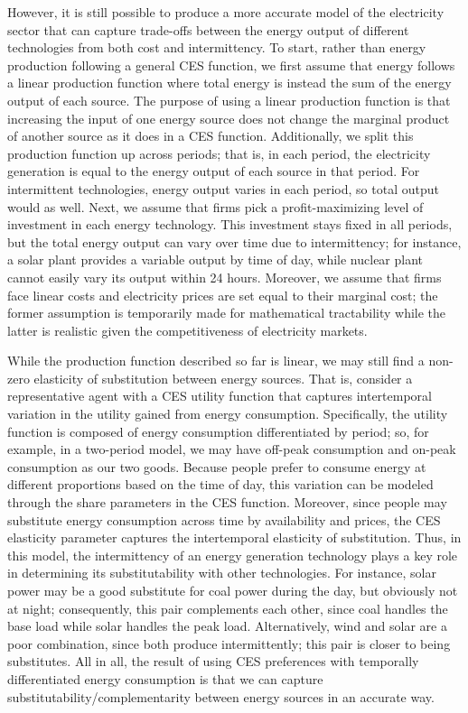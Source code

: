 \documentclass[11pt,a4paper]{extarticle}
\begin{document}
However, it is still possible to produce a more accurate model of the electricity sector that can capture trade-offs between the energy output of different technologies from both cost and intermittency. To start, rather than energy production following a general CES function, we first assume that energy follows a linear production function where total energy is instead the sum of the energy output of each source. The purpose of using a linear production function is that increasing the input of one energy source does not change the marginal product of another source as it does in a CES function. Additionally, we split this production function up across periods; that is, in each period, the electricity generation is equal to the energy output of each source in that period. For intermittent technologies, energy output varies in each period, so total output would as well. Next, we assume that firms pick a profit-maximizing level of investment in each energy technology. This investment stays fixed in all periods, but the total energy output can vary over time due to intermittency; for instance, a solar plant provides a variable output by time of day, while nuclear plant cannot easily vary its output within 24 hours. Moreover, we assume that firms face linear costs and electricity prices are set equal to their marginal cost; the former assumption is temporarily made for mathematical tractability while the latter is realistic given the competitiveness of electricity markets. 

While the production function described so far is linear, we may still find a non-zero elasticity of substitution between energy sources. That is, consider a representative agent with a CES utility function that captures intertemporal variation in the utility gained from energy consumption. Specifically, the utility function is composed of energy consumption differentiated by period; so, for example, in a two-period model, we may have off-peak consumption and on-peak consumption as our two goods. Because people prefer to consume energy at different proportions based on the time of day, this variation can be modeled through the share parameters in the CES function. Moreover, since people may substitute energy consumption across time by availability and prices, the CES elasticity parameter captures the intertemporal elasticity of substitution. Thus, in this model, the intermittency of an energy generation technology plays a key role in determining its substitutability with other technologies. For instance, solar power may be a good substitute for coal power during the day, but obviously not at night; consequently, this pair complements each other, since coal handles the base load while solar handles the peak load. Alternatively, wind and solar are a poor combination, since both produce intermittently; this pair is closer to being substitutes. All in all, the result of using CES preferences with temporally differentiated energy consumption is that we can capture substitutability/complementarity between energy sources in an accurate way. 
\end{document}

